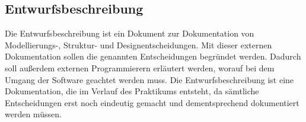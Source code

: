 \subsection{Entwurfsbeschreibung}
Die Entwurfsbeschreibung ist ein Dokument zur Dokumentation von Modellierungs-, Struktur- und Designentscheidungen. Mit dieser externen Dokumentation sollen die genannten Entscheidungen begründet werden. Dadurch soll außerdem externen Programmierern erläutert werden, worauf bei dem Umgang der Software geachtet werden muss. Die Entwurfsbeschreibung ist eine Dokumentation, die im Verlauf des Praktikums entsteht, da sämtliche Entscheidungen erst noch eindeutig gemacht und dementsprechend dokumentiert werden müssen.
